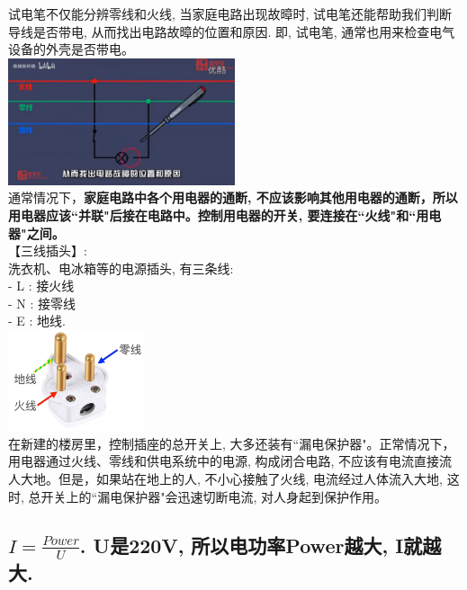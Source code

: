 \documentclass[UTF8]{ctexart}
\begin{document}
试电笔不仅能分辨零线和火线, 当家庭电路出现故暲时, 试电笔还能帮助我们判断导线是否带电, 从而找出电路故暲的位置和原因. 即, 试电笔, 通常也用来检查电气设备的外壳是否带电。 \\
\includegraphics[width=0.5\textwidth]{img/0072.png}  \\

通常情况下，\textbf{家庭电路中各个用电器的通断, 不应该影响其他用电器的通断，所以用电器应该``并联"后接在电路中。控制用电器的开关, 要连接在``火线"和``用电器"之间。} \\



【三线插头】: \\
洗衣机、电冰箱等的电源插头, 有三条线: \\
- L : 接火线 \\
- N : 接零线 \\
- E : 地线.  \\

	\includegraphics[width=0.3\textwidth]{img/0063.png}  \\

	
	在新建的楼房里，控制插座的总开关上, 大多还装有``漏电保护器"。正常情况下，用电器通过火线、零线和供电系统中的电源, 构成闭合电路, 不应该有电流直接流人大地。但是，如果站在地上的人, 不小心接触了火线, 电流经过人体流入大地, 这时, 总开关上的``漏电保护器"会迅速切断电流, 对人身起到保护作用。 \\
	
	
	\vspace{1em} 
	
	
	\subsection{$I=\frac{Power} {U}$. U是220V, 所以电功率Power越大, I就越大.}
	
\end{document}
